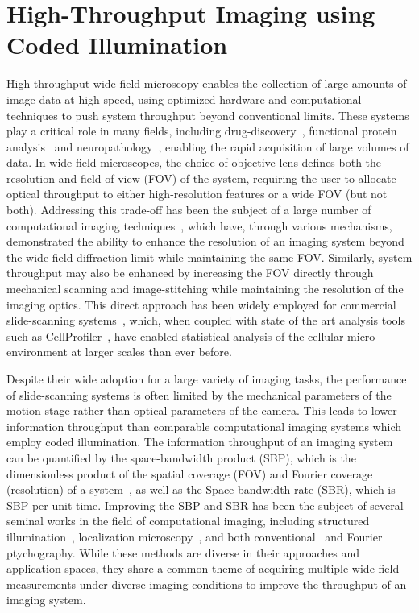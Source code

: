 \chapter{High-Throughput Imaging using Coded Illumination}\label{ch:highthroughput}

High-throughput wide-field microscopy enables the collection of large amounts of image data at high-speed, using optimized hardware and computational techniques to push system throughput beyond conventional limits. These systems play a critical role in many fields, including drug-discovery~\cite{Perlman1194, brodin2011high, bickle2010beautiful}, functional protein analysis~\cite{Liebel:03, huh2003global} and  neuropathology~\cite{peiffer1979alcohol, remmelinck2000could, alegro2017automating}, enabling the rapid acquisition of large volumes of data. In wide-field microscopes, the choice of objective lens defines both the resolution and field of view (FOV) of the system, requiring the user to allocate optical throughput to either high-resolution features or a wide FOV (but not both). Addressing this trade-off has been the subject of a large number of computational imaging techniques~\cite{Zheng2013, betzig2006imaging, Rust:06, gustafsson2000surpassing, rodenburg2004phase, Tian2014}, which have, through various mechanisms, demonstrated the ability to enhance the resolution of an imaging system beyond the wide-field diffraction limit while maintaining the same FOV. Similarly, system throughput may also be enhanced by increasing the FOV directly through mechanical scanning and image-stitching while maintaining the resolution of the imaging optics. This direct approach has been widely employed for commercial slide-scanning systems~\cite{zeissSlideScan}, which, when coupled with state of the art analysis tools such as CellProfiler~\cite{Carpenter2006}, have enabled statistical analysis of the cellular micro-environment at larger scales than ever before. 

Despite their wide adoption for a large variety of imaging tasks, the performance of slide-scanning systems is often limited by the mechanical parameters of the motion stage rather than optical parameters of the camera. This leads to lower information throughput than comparable computational imaging systems which employ coded illumination. The information throughput of an imaging system can be quantified by the space-bandwidth product (SBP), which is the dimensionless product of the spatial coverage (FOV) and Fourier coverage (resolution) of a system~\cite{Lohmann1996space}, as well as the Space-bandwidth rate (SBR), which is SBP per unit time. Improving the SBP and SBR has been the subject of several seminal works in the field of computational imaging, including structured illumination~\cite{gustafsson2000surpassing}, localization microscopy~\cite{Rust:06, betzig2006imaging}, and both conventional~\cite{rodenburg2004phase} and Fourier~\cite{Zheng2013,tian2015computational,Tian2014} ptychography. While these methods are diverse in their approaches and application spaces, they share a common theme of acquiring multiple wide-field measurements under diverse imaging conditions to improve the throughput of an imaging system. 

